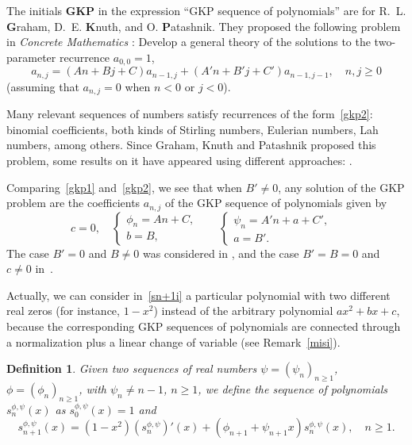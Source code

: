 \documentclass[10pt, a4paper, leqno]{amsart}
\numberwithin{equation}{section}
\theoremstyle{plain}
\newtheorem{Def}{Definition}[section]
\theoremstyle{remark}
\newcommand{\spp}{s^{\phi,\psi}}
\begin{document}
The initials \textbf{GKP} in the expression ``GKP sequence of polynomials'' are for R.~L. \textbf{G}raham, D.~E. \textbf{K}nuth, and O. \textbf{P}atashnik. They proposed the following problem in \textit{Concrete Mathematics}
\cite[Problem 6.94, p.~319]{Knuth-libro}: Develop a general theory of the solutions to the two-parameter recurrence $a_{0,0}=1$,
\begin{equation}
\label{gkp2}
  a_{n,j} = (An+Bj+C)a_{n-1,j}+(A'n+B'j+C')a_{n-1,j-1},\quad n,j\ge 0
\end{equation}
(assuming that $a_{n,j}=0$ when $n<0$ or $j<0$).

Many relevant sequences of numbers satisfy recurrences of the form~\eqref{gkp2}: binomial coefficients, both kinds of Stirling numbers, Eulerian numbers, Lah numbers, among others. Since Graham, Knuth and Patashnik proposed this problem, some results on it have appeared using different approaches: \cite{BSV, Neu, Spi, Th1, Th2, Th3, Wilf2}.

Comparing~\eqref{gkp1} and~\eqref{gkp2}, we see that when $B' \ne 0$, any solution of the GKP problem are the coefficients $a_{n,j}$ of the GKP sequence of polynomials given by
\[
  c=0,\quad
  \begin{cases}
  \phi_n=An+C,& \\
  b=B,&
  \end{cases}
  \quad
  \begin{cases}
  \psi_n=A'n+a+C',& \\
  a=B'.&
  \end{cases}
\]
The case $B'=0$ and $B \ne 0$ was considered in \cite{Duran-Bell,dzol}, and the case $B'=B=0$ and $c \ne 0$ in~\cite{dzoh}.

Actually, we can consider in~\eqref{sn+1i} a particular polynomial with two different real zeros (for instance, $1-x^2$) instead of the arbitrary polynomial $ax^2+bx+c$, because the corresponding GKP sequences of polynomials are connected through a normalization plus a linear change of variable (see Remark~\ref{misi}).

\begin{Def}
Given two sequences of real numbers
$\psi= (\psi_n)_{n \ge 1}$, $\phi = (\phi_n)_{n \ge 1}$,
with $\psi_{n} \ne n-1$, $n\ge 1$, we define the sequence of polynomials
$\spp_n(x)$ as $\spp_0(x)=1$ and
\begin{equation}
\label{sn+1}
  \spp_{n+1}(x) = (1-x^2) (\spp_n)'(x) + (\phi_{n+1} + \psi_{n+1} x)\spp_n(x), \quad n \ge 1.
\end{equation}
\end{Def}
\end{document}
